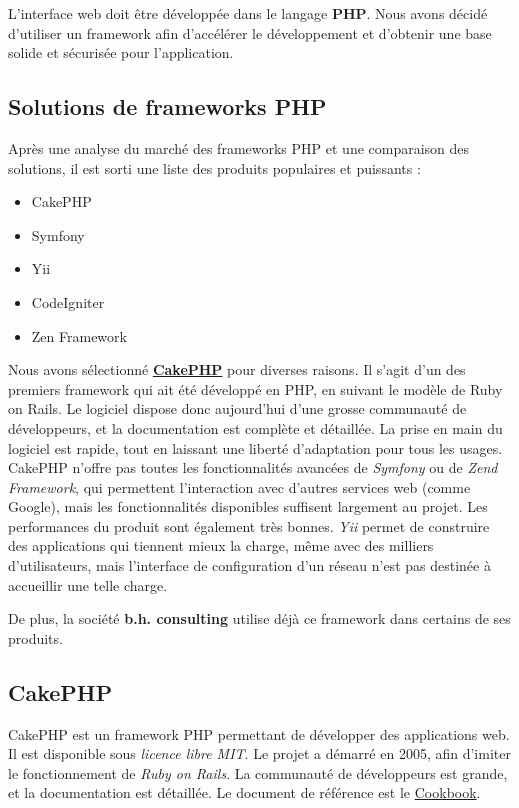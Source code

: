 \documentclass[10pt]{article}
\begin{document}
L'interface web doit être développée dans le langage \textbf{PHP}. Nous avons décidé d'utiliser un framework afin d'accélérer le développement et d'obtenir une base solide et sécurisée pour l'application.

\subsection{Solutions de frameworks PHP}
Après une analyse du marché des frameworks PHP et une comparaison des solutions, il est sorti une liste des produits populaires et puissants :
\begin{itemize}
    \item CakePHP
    \item Symfony
    \item Yii
    \item CodeIgniter
    \item Zen Framework
\end{itemize}



Nous avons sélectionné \href{http://cakephp.org}{\textbf{CakePHP}} pour diverses raisons. Il s'agit d'un des premiers framework qui ait été développé en PHP, en suivant le modèle de Ruby on Rails. Le logiciel dispose donc aujourd'hui d'une grosse communauté de développeurs, et la documentation est complète et détaillée. La prise en main du logiciel est rapide, tout en laissant une liberté d'adaptation pour tous les usages. CakePHP n'offre pas toutes les fonctionnalités avancées de \emph{Symfony} ou de \emph{Zend Framework}, qui permettent l'interaction avec d'autres services web (comme Google), mais les fonctionnalités disponibles suffisent largement au projet. Les performances du produit sont également très bonnes. \emph{Yii} permet de construire des applications qui tiennent mieux la charge, même avec des milliers d'utilisateurs, mais l'interface de configuration d'un réseau n'est pas destinée à accueillir une telle charge.


De plus, la société \textbf{b.h. consulting} utilise déjà ce framework dans certains de ses produits.


\subsection{CakePHP}
CakePHP est un framework PHP permettant de développer des applications web. Il est disponible sous \emph{licence libre MIT}. Le projet a démarré en 2005, afin d'imiter le fonctionnement de \emph{Ruby on Rails}. La communauté de développeurs est grande, et la documentation est détaillée. Le document de référence est le \href{http://book.cakephp.org/fr/view/876/The-Manual}{Cookbook}.
\end{document}
